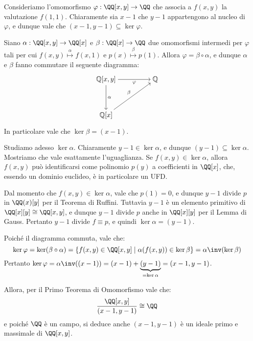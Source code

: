 \documentclass[11pt]{scrartcl}
\begin{document}
	\begin{remark}
		Consideriamo l'omomorfismo $\varphi : \QQ[x, y] \to \QQ$ che
		associa a $f(x, y)$ la valutazione $f(1, 1)$. Chiaramente sia
		$x-1$ che $y-1$ appartengono al nucleo di $\varphi$, e dunque
		vale che $(x-1, y-1) \subseteq \ker \varphi$. \medskip
		
		
		Siano $\alpha : \QQ[x, y] \to \QQ[x]$ e $\beta : \QQ[x] \to \QQ$
		due omomorfismi intermedi per $\varphi$ tali per cui
		$f(x, y) \overset{\alpha}{\mapsto} f(x, 1)$ e $p(x) \overset{\beta}{\mapsto} p(1)$. Allora $\varphi = \beta \circ \alpha$, e dunque $\alpha$ e $\beta$ fanno commutare il seguente diagramma:
		
		\[\begin{tikzcd}[cramped]
			{\mathbb{Q}[x, y]} && {\mathbb{Q}} \\
			\\
			{\mathbb{Q}[x]}
			\arrow["\alpha", from=1-1, to=3-1]
			\arrow["\beta", from=3-1, to=1-3]
			\arrow["\varphi"', from=1-1, to=1-3]
		\end{tikzcd}\]
		
		In particolare vale che $\ker \beta = (x-1)$. \medskip
		
		
		Studiamo adesso
		$\ker \alpha$. Chiaramente $y-1 \in \ker \alpha$, e dunque
		$(y-1) \subseteq \ker \alpha$. Mostriamo che vale esattamente
		l'uguaglianza. Se $f(x,y) \in \ker \alpha$, allora $f(x,y)$ può
		identificarsi come polinomio $p(y)$ a coefficienti in $\QQ[x]$,
		che, essendo un dominio euclideo, è in particolare un UFD. \medskip
		
		
		Dal momento che $f(x, y) \in \ker \alpha$, vale che $p(1) = 0$,
		e dunque $y-1$ divide $p$ in $\QQ(x)[y]$ per il Teorema di Ruffini.
		Tuttavia $y-1$ è un elemento primitivo di $\QQ[x][y] \cong \QQ[x, y]$,
		e dunque $y-1$ divide $p$ anche in $\QQ[x][y]$ per il Lemma di Gauss.
		Pertanto $y-1$ divide $f \equiv p$, e quindi $\ker \alpha = (y-1)$. \medskip
		
		
		Poiché il diagramma commuta, vale che:
		\[ \ker \varphi = \ker (\beta \circ \alpha) = \{ f(x, y) \in \QQ[x, y] \mid \alpha(f(x,y)) \in \ker \beta \} = \alpha\inv(\ker \beta) \]
		Pertanto $\ker \varphi = \alpha\inv((x-1)) = (x-1) + \underbrace{(y-1)}_{=\ker \alpha} = (x-1, y-1)$. \medskip
		
		
		Allora, per il Primo Teorema di Omomorfismo vale che:
		\[ \frac{\QQ[x, y]}{(x-1, y-1)} \cong \QQ \]
		e poiché $\QQ$ è un campo, si deduce anche $(x-1, y-1)$ è un ideale primo
		e massimale di $\QQ[x, y]$.
		
	\end{remark}
	
\end{document}
